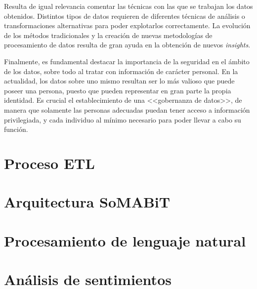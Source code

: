 Resulta de igual relevancia comentar las técnicas con las que se trabajan los datos obtenidos. Distintos tipos de datos requieren de diferentes técnicas de análisis o transformaciones alternativas para poder explotarlos correctamente. La evolución de los métodos tradicionales y la creación de nuevas metodologías de procesamiento de datos resulta de gran ayuda en la obtención de nuevos \textit{insights}.

Finalmente, es fundamental destacar la importancia de la seguridad en el ámbito de los datos, sobre todo al tratar con información de carácter personal. En la actualidad, los datos sobre uno mismo resultan ser lo más valioso que puede poseer una persona, puesto que pueden representar en gran parte la propia identidad. Es crucial el establecimiento de una <<gobernanza de datos>>, de manera que solamente las personas adecuadas puedan tener acceso a información privilegiada, y cada individuo al mínimo necesario para poder llevar a cabo su función.

\section{Proceso ETL}

\section{Arquitectura SoMABiT}

\section{Procesamiento de lenguaje natural}

\section{Análisis de sentimientos}